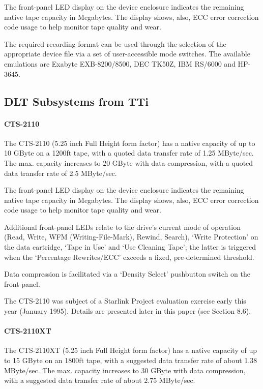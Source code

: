 The front-panel LED display on the device enclosure indicates the remaining
native tape capacity in Megabytes. The display shows, also, ECC error
correction code usage to help monitor tape quality and wear.

The required recording format can be used through the selection of the
appropriate device file via a set of user-accessible mode switches. The
available emulations are Exabyte EXB-8200/8500, DEC TK50Z, IBM RS/6000 and
HP-3645.

\subsection {DLT Subsystems from TTi}

\paragraph {CTS-2110}

The CTS-2110 (5.25 inch Full Height form factor) has a native capacity of up
to 10 GByte on a 1200ft tape, with a quoted data transfer rate of 1.25
MByte/sec. The max. capacity increases to 20 GByte with data compression, with a
quoted data transfer rate of 2.5 MByte/sec.

The front-panel LED display on the device enclosure indicates the remaining
native tape capacity in Megabytes. The display shows, also, ECC error
correction code usage to help monitor tape quality and wear.

Additional front-panel LEDs relate to the drive's current mode of operation
(Read, Write, WFM (Writing-File-Mark), Rewind, Search), `Write Protection' on
the data cartridge, `Tape in Use' and `Use Cleaning Tape'; the latter is
triggered when the `Percentage Rewrites/ECC' exceeds a fixed, pre-determined
threshold.

Data compression is facilitated via a `Density Select' pushbutton switch on the
front-panel.

The CTS-2110 was subject of a Starlink Project evaluation exercise early
this year (January 1995). Details are presented later in this paper (see
Section 8.6).

\paragraph {CTS-2110XT}

The CTS-2110XT (5.25 inch Full Height form factor) has a native capacity of
up to 15 GByte on an 1800ft tape, with a suggested data transfer rate of about
1.38 MByte/sec. The max. capacity increases to 30 GByte with data compression,
with a suggested data transfer rate of about 2.75 MByte/sec.

